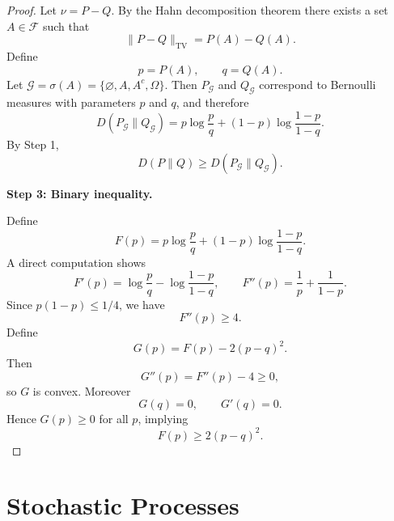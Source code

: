 \documentclass[12pt]{article}
\renewcommand{\(}{\left(}%
\renewcommand{\)}{\right)}%
\renewcommand{\[}{\left[}%
\renewcommand{\]}{\right]}%
\newtheorem{proof}{Proof.}}
\begin{document}
\begin{proof}
Let $\nu=P-Q$. By the Hahn decomposition theorem there exists a set
$A\in\mathcal F$ such that
\begin{equation*}
\|P-Q\|_{\mathrm{TV}}
=
P(A)-Q(A).
\end{equation*}
Define
\begin{equation*}
p=P(A), \qquad q=Q(A).
\end{equation*}
Let $\mathcal G=\sigma(A)=\{\varnothing,A,A^c,\Omega\}$. Then
$P_{\mathcal G}$ and $Q_{\mathcal G}$ correspond to Bernoulli
measures with parameters $p$ and $q$, and therefore
\begin{equation*}
D(P_{\mathcal G}\|Q_{\mathcal G})
=
p\log\frac{p}{q}
+
(1-p)\log\frac{1-p}{1-q}.
\end{equation*}
By Step 1,
\begin{equation*}
D(P\|Q)
\ge
D(P_{\mathcal G}\|Q_{\mathcal G}).
\end{equation*}

\medskip
\noindent
\textbf{Step 3: Binary inequality.}

Define
\begin{equation*}
F(p)
=
p\log\frac{p}{q}
+
(1-p)\log\frac{1-p}{1-q}.
\end{equation*}
A direct computation shows
\begin{equation*}
F'(p)
=
\log\frac{p}{q}
-
\log\frac{1-p}{1-q},
\qquad
F''(p)=\frac1p+\frac1{1-p}.
\end{equation*}
Since $p(1-p)\le 1/4$, we have
\begin{equation*}
F''(p)\ge 4.
\end{equation*}
Define
\begin{equation*}
G(p)=F(p)-2(p-q)^2.
\end{equation*}
Then
\begin{equation*}
G''(p)=F''(p)-4\ge 0,
\end{equation*}
so $G$ is convex. Moreover
\begin{equation*}
G(q)=0,
\qquad
G'(q)=0.
\end{equation*}
Hence $G(p)\ge 0$ for all $p$, implying
\begin{equation*}
F(p)\ge 2(p-q)^2.
\end{equation*}
\end{proof}


  \section{Stochastic Processes}
\end{document}
